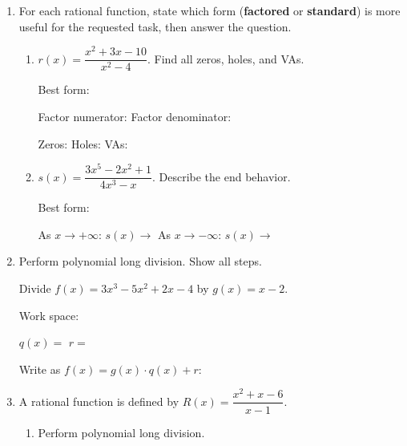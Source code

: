 \documentclass[10pt]{article}
\begin{document}
\namedateperiod

\vspace{0.12in}

\begin{enumerate}[itemsep=18pt]

\item For each rational function, state which form (\textbf{factored} or \textbf{standard}) is
      more useful for the requested task, then answer the question.

      \begin{enumerate}[label=(\alph*), itemsep=10pt]
        \item $r(x) = \dfrac{x^2+3x-10}{x^2-4}$. \quad Find all zeros, holes, and VAs.

              \vspace{0.06in}
              Best form: \blank{3cm}

              Factor numerator: \blank{5cm} \quad Factor denominator: \blank{5cm}

              Zeros: \blank{3cm} \quad Holes: \blank{3cm} \quad VAs: \blank{3cm}

        \item $s(x) = \dfrac{3x^5 - 2x^2 + 1}{4x^3 - x}$. \quad Describe the end behavior.

              \vspace{0.06in}
              Best form: \blank{3cm}

              As $x \to +\infty$: $s(x) \to$ \blank{3cm} \quad As $x \to -\infty$: $s(x) \to$ \blank{3cm}
      \end{enumerate}

\item Perform polynomial long division. Show all steps.

      Divide $f(x) = 3x^3 - 5x^2 + 2x - 4$ by $g(x) = x - 2$.

      \vspace{0.1in}
      Work space:

      \vspace{1.0in}

      $q(x) = $ \blank{5cm} \quad $r = $ \blank{2cm}

      Write as $f(x) = g(x)\cdot q(x) + r$: \blank{8cm}

\item A rational function is defined by $\displaystyle R(x) = \dfrac{x^2 + x - 6}{x - 1}$.

      \begin{enumerate}[label=(\alph*), itemsep=8pt]
        \item Perform polynomial long division.


\end{enumerate}
\end{enumerate}
\end{document}
